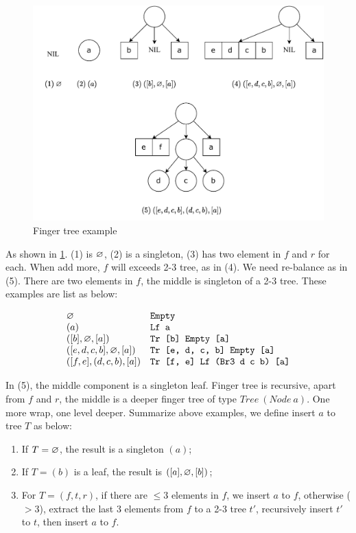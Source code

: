 \documentclass[b5paper]{article}
\begin{document}
\begin{figure}[htbp]
  \centering
  \includegraphics[scale=0.6]{img/ftr-insert}
  \caption{Finger tree example}
  \label{fig:ftr-example}
\end{figure}

As shown in \cref{fig:ftr-example}. (1) is $\varnothing$, (2) is a singleton, (3) has two element in $f$ and $r$ for each. When add more, $f$ will exceeds 2-3 tree, as in (4). We need re-balance as in (5). There are two elements in $f$, the middle is singleton of a 2-3 tree. These examples are list as below:

\[
\begin{array}{ll}
\varnothing & \texttt{Empty}\\
(a) & \texttt{Lf a}\\
([b], \varnothing, [a]) & \texttt{Tr [b] Empty [a]}\\
([e, d, c, b], \varnothing, [a]) & \texttt{Tr [e, d, c, b] Empty [a]}\\
([f, e], (d, c, b), [a]) & \texttt{Tr [f, e] Lf (Br3 d c b) [a]}\\
\end{array}
\]


In (5), the middle component is a singleton leaf. Finger tree is recursive, apart from $f$ and $r$, the middle is a deeper finger tree of type $Tree\ (Node\ a)$. One more wrap, one level deeper. Summarize above examples, we define insert $a$ to tree $T$ as below:

\begin{enumerate}
\item If $T = \varnothing$, the result is a singleton $(a)$;
\item If $T = (b)$ is a leaf, the result is $([a], \varnothing, [b])$;
\item For $T = (f, t, r)$, if there are $\leq 3$ elements in $f$, we insert $a$ to $f$, otherwise ($> 3$), extract the last 3 elements from $f$ to a 2-3 tree $t'$, recursively insert $t'$ to $t$, then insert $a$ to $f$.
\end{enumerate}
\end{document}
